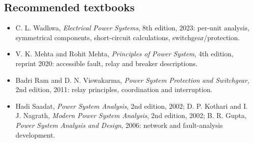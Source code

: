 \documentclass[11pt,a4paper]{article}
\begin{document}
\subsection{Recommended textbooks}
\begin{itemize}
\item C. L. Wadhwa, \emph{Electrical Power Systems}, 8th edition, 2023: per-unit analysis, symmetrical components, short-circuit calculations, switchgear/protection.
\item V. K. Mehta and Rohit Mehta, \emph{Principles of Power System}, 4th edition, reprint 2020: accessible fault, relay and breaker descriptions.
\item Badri Ram and D. N. Viswakarma, \emph{Power System Protection and Switchgear}, 2nd edition, 2011: relay principles, coordination and interruption.
\item Hadi Saadat, \emph{Power System Analysis}, 2nd edition, 2002; D. P. Kothari and I. J. Nagrath, \emph{Modern Power System Analysis}, 2nd edition, 2002; B. R. Gupta, \emph{Power System Analysis and Design}, 2006: network and fault-analysis development.
\end{itemize}
\end{document}
